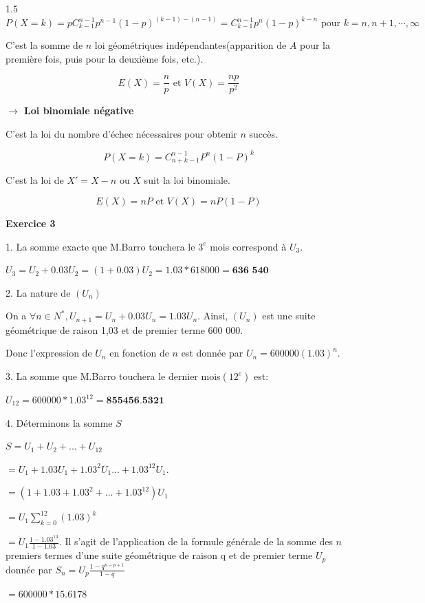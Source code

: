 \documentclass[12pt]{article}
\begin{document}
\begin{spacing}{1.5}
\[P(X=k)=pC_{k-1}^{n-1}p^{n-1}(1-p)^{(k-1)-(n-1)}=C_{k-1}^{n-1}p^n(1-p)^{k-n} \text{ pour } k=n,n+1,\cdots,\infty\]

C'est la somme de $n$ loi géométriques indépendantes(apparition de $A$ pour la première fois, puis pour la deuxième fois, etc.).

\[E(X)=\frac{n}{p} \text{ et } V(X)=\frac{np}{p^2}\]

\medskip\textbf{$\rightarrow$ Loi binomiale négative}

C'est la loi du nombre d'échec nécessaires pour obtenir $n$ succès.

\[P(X=k)=C_{n+k-1}^{n-1}P^n(1-P)^k\]

C'est la loi de $X'=X-n$ ou $X$ suit la loi binomiale.

\[E(X)=nP \text{ et } V(X)=nP(1-P)\]


\medskip\textbf{Exercice 3}

1. La somme exacte que M.Barro touchera le $3^e$ mois correspond à $U_3$.

$U_3=U_2 +0.03U_2=(1+0.03)U_2=1.03*618 000 =\textbf{636 540}$

2. La nature de $(U_n)$

On a $\forall n\in N^*,U_{n+1}=U_n+0.03U_n=1.03U_n$.  Ainsi, $(U_n)$ est une suite géométrique de raison 1,03 et de premier terme 600 000.

Donc l'expression de $U_n$ en fonction de $n$ est donnée par $U_n=600 000(1.03)^n$.

3. La somme que M.Barro touchera le dernier mois$(12^e)$ est:

$U_{12}=600 000*1.03^{12}= \textbf{855456.5321}$

4. Déterminons la somme $S$

$S=U_1+U_2+...+U_{12}$

\hspace{0.358cm}$=U_1+1.03U_1+1.03^2U_1...+1.03^{12}U_1$.

\hspace{0.358cm}$=(1+1.03+1.03^2+...+1.03^{12})U_1$

\hspace{0.358cm}$=U_1\sum_{k=0}^{12}(1.03)^k$

\hspace{0.358cm}$=U_1\frac{1-1.03^{13}}{1-1.03}$. Il s'agit de l'application de la formule générale de la somme des $n$ premiers termes d'une suite géométrique de raison q et de premier terme $U_p$ donnée par $S_n=U_p\frac{1-q^{n-p+1}}{1-q}$

\hspace{0.358cm}$=600 000*15.6178$


\end{spacing}
\end{document}
